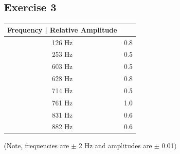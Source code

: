\documentclass[a4paper,12pt]{article}
\begin{document}
\subsection{Exercise 3}
\begin{tabular}{c | c}
  Frequency | Relative Amplitude \\
  \hline
  126 Hz & 0.8 \\
  253 Hz & 0.5 \\
  603 Hz & 0.5 \\
  628 Hz & 0.8 \\
  714 Hz & 0.5 \\
  761 Hz & 1.0 \\
  831 Hz & 0.6 \\
  882 Hz & 0.6 \\
\end{tabular}

(Note, frequencies are $\pm$ 2 Hz and amplitudes are $\pm$ 0.01) \\
\end{document}
